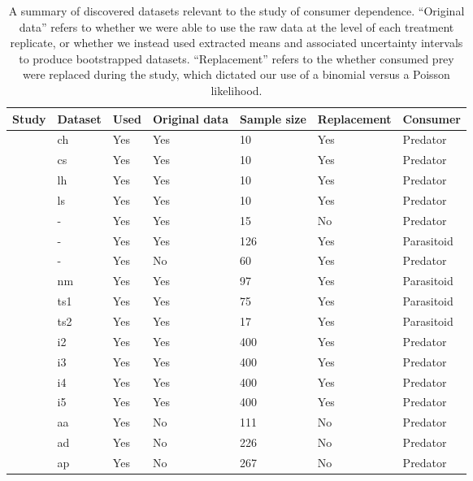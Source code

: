 \begin{table}[!tbp]
\caption{A summary of discovered datasets relevant to the study of consumer dependence.  ``Original data'' refers to whether we were able to use the raw data at the level of each treatment replicate, or whether we instead used extracted means and associated uncertainty intervals to produce bootstrapped datasets. ``Replacement'' refers to the whether consumed prey were replaced during the study, which dictated our use of a binomial versus a Poisson likelihood. \label{table:datasets}} 
\begin{center}
\begin{tabular}{lllllll}
\hline\hline
\multicolumn{1}{c}{Study}&\multicolumn{1}{c}{Dataset}&\multicolumn{1}{c}{Used}&\multicolumn{1}{c}{Original data}&\multicolumn{1}{c}{Sample size}&\multicolumn{1}{c}{Replacement}&\multicolumn{1}{c}{Consumer}\tabularnewline
\hline
\citet{Chan:2017aa}&ch&Yes&Yes&10&Yes&Predator\tabularnewline
\citet{Chan:2017aa}&cs&Yes&Yes&10&Yes&Predator\tabularnewline
\citet{Chan:2017aa}&lh&Yes&Yes&10&Yes&Predator\tabularnewline
\citet{Chan:2017aa}&ls&Yes&Yes&10&Yes&Predator\tabularnewline
\citet{Chant:1966aa}&-&Yes&Yes&15&No&Predator\tabularnewline
\citet{Chong:2006aa}&-&Yes&Yes&126&Yes&Parasitoid\tabularnewline
\citet{Crowley:1989aa}&-&Yes&No&60&Yes&Predator\tabularnewline
\citet{Edwards:1961aa}&nm&Yes&Yes&97&Yes&Parasitoid\tabularnewline
\citet{Edwards:1961aa}&ts1&Yes&Yes&75&Yes&Parasitoid\tabularnewline
\citet{Edwards:1961aa}&ts2&Yes&Yes&17&Yes&Parasitoid\tabularnewline
\citet{Elliott:2005aa}&i2&Yes&Yes&400&Yes&Predator\tabularnewline
\citet{Elliott:2005aa}&i3&Yes&Yes&400&Yes&Predator\tabularnewline
\citet{Elliott:2005aa}&i4&Yes&Yes&400&Yes&Predator\tabularnewline
\citet{Elliott:2005aa}&i5&Yes&Yes&400&Yes&Predator\tabularnewline
\citet{Eveleigh:1982aa}&aa&Yes&No&111&No&Predator\tabularnewline
\citet{Eveleigh:1982aa}&ad&Yes&No&226&No&Predator\tabularnewline
\citet{Eveleigh:1982aa}&ap&Yes&No&267&No&Predator\tabularnewline

\end{tabular}
\end{center}
\end{table}
